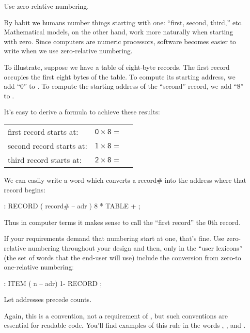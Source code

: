 \begin{tip}
Use zero-relative numbering.
\end{tip}
By habit we humans number things starting with one: ``first, second,
third,'' etc. Mathematical models, on the other hand, work more naturally
when starting with zero. Since computers are numeric processors, software
becomes easier to write when we use zero-relative numbering.

To illustrate, suppose we have a table of eight-byte records. The first
record occupies the first eight bytes of the table. To compute its
starting address, we add ``0'' to . To compute the starting
address of the ``second'' record, we add ``8'' to .


\medbreak
It's easy to derive a formula to achieve these results:

\bigskip
\begin{tabular}{@{}l@{ }l@{}r}
\sf first record starts at:  &  $\mathsf{0 \times 8} = {}$ & \sf 0  \\
\sf second record starts at: &  $\mathsf{1 \times 8} = {}$ & \sf 8  \\
\sf third record starts at:  &  $\mathsf{2 \times 8} = {}$ & \sf 16 \\
\end{tabular}
\bigskip

\noindent
We can easily write a word which converts a record\# into the address
where that record begins:

\begin{Code}
: RECORD  ( record# -- adr )
   8 *  TABLE + ;
\end{Code}
Thus in computer terms it makes sense to call the ``first record'' the 0th
record.

If your requirements demand that numbering start at one, that's
fine. Use zero-relative numbering throughout your design and then, only
in the ``user lexicons'' (the set of words that the end-user will use)
include the conversion from zero-to one-relative numbering:
\begin{Code}
: ITEM  ( n -- adr)  1- RECORD ;
\end{Code}

\begin{tip}
Let addresses precede counts.
\end{tip}
Again, this is a convention, not a requirement of \Forth{}, but such
conventions are essential for readable code. You'll find examples of this
rule in the words , , and .

